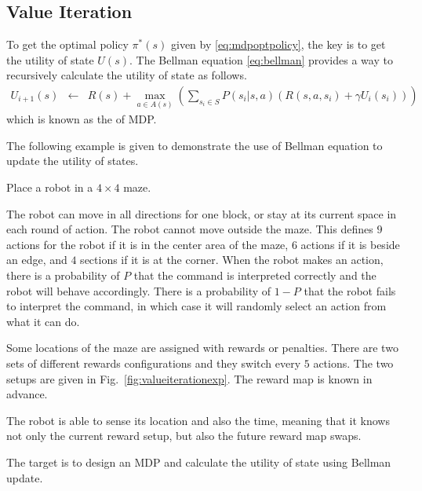 \subsection{Value Iteration} \label{sec:mdpvalue}

To get the optimal policy $\pi^*(s)$ given by \eqref{eq:mdpoptpolicy}, the key is to get the utility of state $U(s)$. The Bellman equation \eqref{eq:bellman} provides a way to recursively calculate the utility of state as follows.
\begin{eqnarray}
	U_{i+1}(s) &\leftarrow& R(s) + \max_{a\in A(s)}\left(\sum_{s_i \in S} P(s_i|s,a)\left(R(s,a,s_i) + \gamma U_i(s_i)\right)\right) \label{eq:bellmanupdate}
\end{eqnarray}
which is known as the  of MDP.

The following example is given to demonstrate the use of Bellman equation to update the utility of states.

\begin{shortbox}

Place a robot in a $4\times 4$ maze. 

The robot can move in all directions for one block, or stay at its current space in each round of action. The robot cannot move outside the maze. This defines $9$ actions for the robot if it is in the center area of the maze, $6$ actions if it is beside an edge, and $4$ sections if it is at the corner. When the robot makes an action, there is a probability of $P$ that the command is interpreted correctly and the robot will behave accordingly. There is a probability of $1-P$ that the robot fails to interpret the command, in which case it will randomly select an action from what it can do.

Some locations of the maze are assigned with rewards or penalties. There are two sets of different rewards configurations and they switch every $5$ actions. The two setups are given in Fig.~\ref{fig:valueiterationexp}. The reward map is known in advance.

The robot is able to sense its location and also the time, meaning that it knows not only the current reward setup, but also the future reward map swaps.

The target is to design an MDP and calculate the utility of state using Bellman update. 

\end{shortbox}

